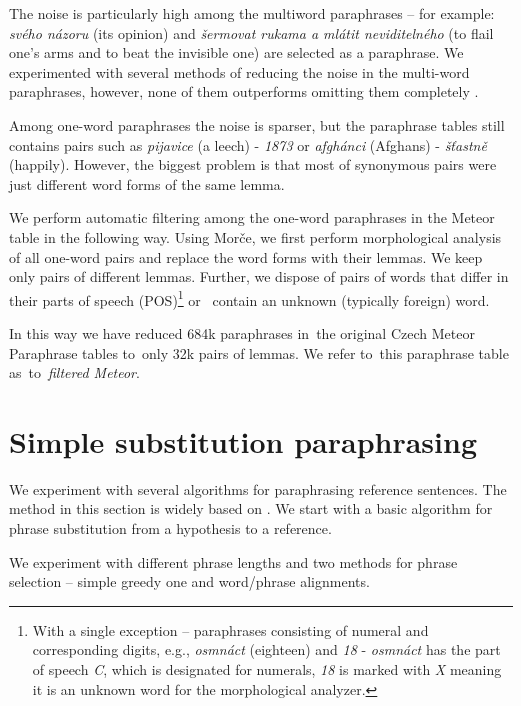 \documentclass[11pt]{article}
\begin{document}
The noise is particularly high among the multiword paraphrases -- for %
example: \textit{svého názoru} (its opinion) and \textit{šermovat rukama a 
mlátit neviditelného} (to flail one's arms and to beat the invisible one) are 
selected as a paraphrase. We experimented with several methods of reducing
the noise in the multi-word paraphrases, however, none of them outperforms
omitting them completely \cite{barancikova:2014}.
 
Among one-word paraphrases the noise is sparser, but the paraphrase tables  %
still contains pairs such as \textit{pijavice} (a leech) - \textit{1873}
or \textit{afgh\'{a}nci} (Afghans) - \textit{š\v{t}astně} (happily). 
However, the biggest problem is that most of synonymous pairs were just 
different word forms of the same lemma. 

We perform automatic filtering among the one-word paraphrases in the 
Meteor table in the following way. Using Morče, we first perform morphological  %
analysis of all one-word pairs and replace the word forms with their lemmas. We 
keep only pairs of different lemmas. Further, we dispose of pairs of words that 
differ in their parts of speech (POS)\footnote{With a single exception -- 
paraphrases consisting of numeral and corresponding digits, e.g., 
\textit{osmnáct} (eighteen) and \textit{18} - \textit{osmnáct} has the part of 
speech \textit{C}, which is designated for numerals, \textit{18} is marked with 
\textit{X} meaning it is an unknown word for the morphological analyzer.} or
~contain an unknown (typically foreign) word.

In this way we have reduced 684k paraphrases in~the original Czech Meteor 
Paraphrase tables to~only 32k pairs of lemmas. We refer to~this paraphrase
table as~to~\textit{filtered Meteor}.

\section{Simple substitution paraphrasing}
\label{lrec}
We experiment with several algorithms for paraphrasing reference sentences. 
The method in this section is widely based on . We start with 
a basic algorithm for phrase substitution from a hypothesis to a reference. 

We experiment with different phrase lengths and two methods for phrase 
selection -- simple greedy one and word/phrase alignments.
\end{document}
